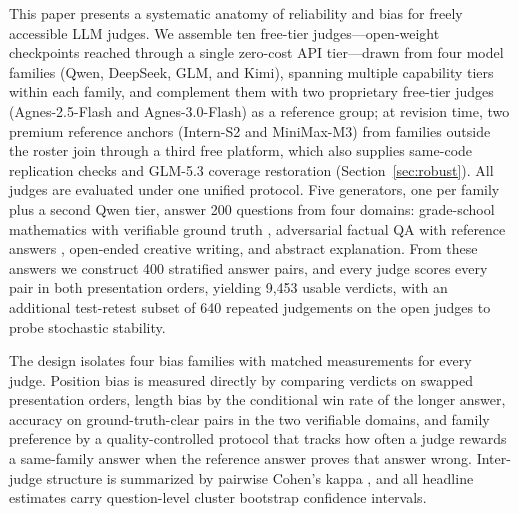 \documentclass[review,12pt]{elsarticle}
\begin{document}
This paper presents a systematic anatomy of reliability and bias for
freely accessible LLM judges. We assemble ten free-tier judges---open-weight
checkpoints reached through a single zero-cost API tier---drawn from
four model families (Qwen, DeepSeek, GLM, and Kimi), spanning multiple
capability tiers within each family, and complement them with two proprietary
free-tier judges (Agnes-2.5-Flash and Agnes-3.0-Flash) as a reference group;
at revision time, two premium reference anchors (Intern-S2 and MiniMax-M3)
from families outside the roster join through a third free platform, which
also supplies same-code replication checks and GLM-5.3 coverage restoration
(Section~\ref{sec:robust}). All judges are evaluated under one unified
protocol. Five generators, one per
family plus a second Qwen tier, answer 200
questions from four domains: grade-school mathematics with verifiable ground
truth \citep{cobbe2021training}, adversarial factual QA with reference answers
\citep{lin2022truthfulqa}, open-ended creative writing, and abstract
explanation. From these answers we construct 400 stratified answer pairs, and
every judge scores every pair in both presentation orders, yielding
9,453 usable verdicts, with an additional test-retest subset of
640 repeated judgements on the open judges to probe stochastic
stability.

The design isolates four bias families with matched measurements for every
judge. Position bias is measured directly by comparing verdicts on swapped
presentation orders, length bias by the conditional win rate of the longer
answer, accuracy on ground-truth-clear pairs in the two verifiable domains,
and family preference by a quality-controlled protocol that tracks how often
a judge rewards a same-family answer when the reference answer proves that
answer wrong. Inter-judge structure is summarized by pairwise Cohen's kappa
\citep{cohen1960coefficient}, and all headline estimates carry question-level
cluster bootstrap confidence intervals.
\end{document}
